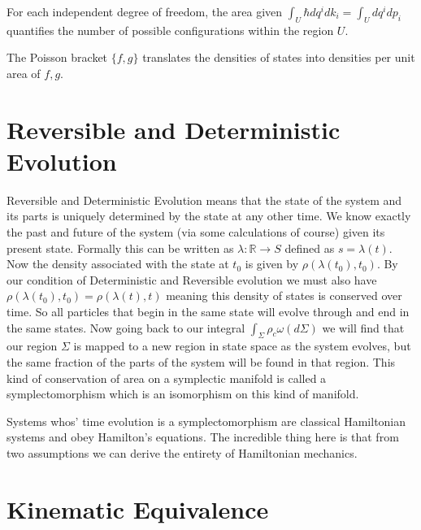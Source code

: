 \documentclass{article}
\begin{document}
\begin{prop}
	For each independent degree of freedom, the area given $\int_U \hbar dq^i dk_i = \int_U dq^i dp_i$ quantifies the number of possible configurations within the region $U$.
\end{prop}

\begin{prop}
	The Poisson bracket $\{f, g\}$ translates the densities of states into densities per unit area of $f, g$.
\end{prop}
	
\section{Reversible and Deterministic Evolution}

	Reversible and Deterministic Evolution means that the state of the system and its parts is uniquely determined by the state at any other time. We know exactly the past and future of the system (via some calculations of course) given its present state. Formally this can be written as $\lambda: \mathbb{R} \rightarrow S$ defined as $s = \lambda(t)$. Now the density associated with the state at $t_0$ is given by $\rho(\lambda(t_0),t_0)$. By our condition of Deterministic and Reversible evolution we must also have $\rho(\lambda(t_0),t_0) = \rho(\lambda(t),t)$ meaning this density of states is conserved over time. So all particles that begin in the same state will evolve through and end in the same states. Now going back to our integral $\int_{\Sigma} \rho_c\omega(d\Sigma)$ we will find that our region $\Sigma$ is mapped to a new region in state space as the system evolves, but the same fraction of the parts of the system will be found in that region. This kind of conservation of area on a symplectic manifold is called a symplectomorphism which is an isomorphism on this kind of manifold. 
	
	Systems whos' time evolution is a symplectomorphism are classical Hamiltonian systems and obey Hamilton's equations. The incredible thing here is that from two assumptions we can derive the entirety of Hamiltonian mechanics. 




\section{Kinematic Equivalence}
\end{document}
